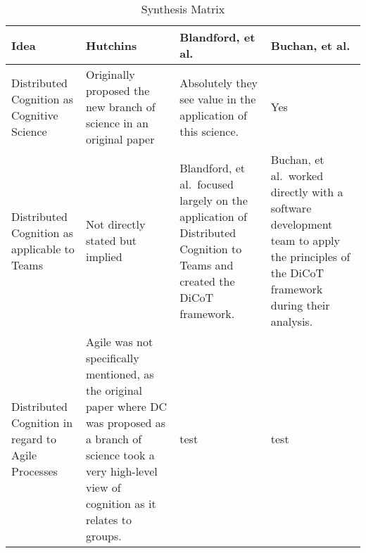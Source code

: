 \begin{table}%
\caption{Synthesis Matrix}\label{tab:synthesis-matrix}
\begin{minipage}{\columnwidth}
\begin{center}
\begin{tabular}{|p{0.75in}|p{1.5in}|p{1.5in}|p{1.5in}|}
\hline
Idea & Hutchins\cite{hutchins2000distributed} & Blandford, et al.\cite{blandford2005dicot} & Buchan, et al.\cite{buchan2020applying} \\
\hline
Distributed Cognition as Cognitive Science & 
Originally proposed the new branch of science in an original paper &
Absolutely they see value in the application of this science. &
Yes
\\
\hline
Distributed Cognition as applicable to Teams &
Not directly stated but implied &
Blandford, et al.\ focused largely on the application of Distributed Cognition to Teams and created the DiCoT framework. &
Buchan, et al.\ worked directly with a software development team to apply the principles of the DiCoT framework during their analysis.
\\
\hline
Distributed Cognition in regard to Agile Processes &
Agile was not specifically mentioned, as the original paper where DC was proposed as a branch of science took a very high-level view of cognition as it relates to groups. &
test &
test
\\
\hline
\end{tabular}
\end{center}
\bigskip\centering
\end{minipage}
\end{table}%

